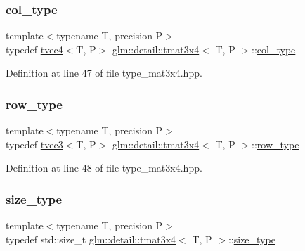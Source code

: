\subsubsection{\texorpdfstring{col\+\_\+type}{col\_type}}
{\footnotesize\ttfamily template$<$typename T, precision P$>$ \\
typedef \hyperlink{structglm_1_1detail_1_1tvec4}{tvec4}$<$T, P$>$ \hyperlink{structglm_1_1detail_1_1tmat3x4}{glm\+::detail\+::tmat3x4}$<$ T, P $>$\+::\hyperlink{structglm_1_1detail_1_1tmat3x4_aadea597c799e263c7580c0291753d0de}{col\+\_\+type}}



Definition at line 47 of file type\+\_\+mat3x4.\+hpp.

\mbox{\label{structglm_1_1detail_1_1tmat3x4_a4396c64d7fb3b10e98119bf1cac9ce9b}} 
\subsubsection{\texorpdfstring{row\+\_\+type}{row\_type}}
{\footnotesize\ttfamily template$<$typename T, precision P$>$ \\
typedef \hyperlink{structglm_1_1detail_1_1tvec3}{tvec3}$<$T, P$>$ \hyperlink{structglm_1_1detail_1_1tmat3x4}{glm\+::detail\+::tmat3x4}$<$ T, P $>$\+::\hyperlink{structglm_1_1detail_1_1tmat3x4_a4396c64d7fb3b10e98119bf1cac9ce9b}{row\+\_\+type}}



Definition at line 48 of file type\+\_\+mat3x4.\+hpp.

\mbox{\label{structglm_1_1detail_1_1tmat3x4_a6c23d9c4bf2cb48cfcdbec0b5d8451d2}} 
\subsubsection{\texorpdfstring{size\+\_\+type}{size\_type}}
{\footnotesize\ttfamily template$<$typename T, precision P$>$ \\
typedef std\+::size\+\_\+t \hyperlink{structglm_1_1detail_1_1tmat3x4}{glm\+::detail\+::tmat3x4}$<$ T, P $>$\+::\hyperlink{structglm_1_1detail_1_1tmat3x4_a6c23d9c4bf2cb48cfcdbec0b5d8451d2}{size\+\_\+type}}




